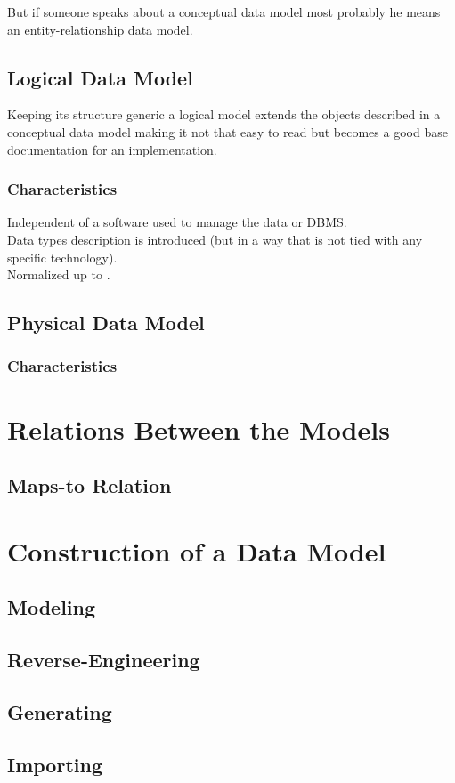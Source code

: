 
But if someone speaks about a conceptual data model most probably he means an entity-relationship data model.

\subsection{Logical Data Model}

Keeping its structure generic a logical model extends the objects described in a conceptual data model making it not that easy to read but becomes a good base documentation for an implementation.

\subsubsection{Characteristics}
Independent of a software used to manage the data or DBMS. \\
Data types description is introduced (but in a way that is not tied with any specific technology). \\
Normalized up to . \\

\subsection{Physical Data Model}

\subsubsection{Characteristics}

\section{Relations Between the Models}

\subsection{Maps-to Relation}

\section{Construction of a Data Model}

\subsection{Modeling}

\subsection{Reverse-Engineering}

\subsection{Generating}

\subsection{Importing}
